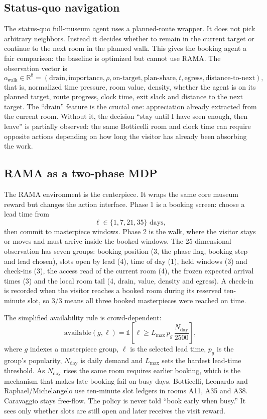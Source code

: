 \documentclass[11pt]{article}
\newcommand{\R}{\mathbb{R}}
\newcommand{\ind}{\mathbb{1}}
\begin{document}
\subsection{Status-quo navigation}

The status-quo full-museum agent uses a planned-route wrapper. It does not pick arbitrary neighbors.
Instead it decides whether to remain in the current target or continue to the next room in the planned walk.
This gives the booking agent a fair comparison: the baseline is optimized but cannot use RAMA. The
observation vector is
\[
o_{\text{walk}}\in\R^8 =
(\text{drain},\text{importance},\rho,\text{on-target},\text{plan-share},t,\text{egress},
\text{distance-to-next}),
\]
that is, normalized time pressure, room value, density, whether the agent is on its planned target,
route progress, clock time, exit slack and distance to the next target. The ``drain'' feature is the
crucial one: appreciation already extracted from the current room. Without it, the decision ``stay
until I have seen enough, then leave'' is partially observed: the same Botticelli room
and clock time can require opposite actions depending on how long the visitor has already been
absorbing the work.

\subsection{RAMA as a two-phase MDP}

The RAMA environment is the centerpiece. It wraps the same core museum reward but changes the action
interface. Phase 1 is a booking screen: choose a lead time from
\[
\ell\in\{1,7,21,35\}\text{ days},
\]
then commit to masterpiece windows. Phase 2 is the walk, where the visitor stays or moves and must
arrive inside the booked windows. The 25-dimensional observation has seven groups: booking position (3, the phase flag, booking step and
lead chosen), slots open by lead (4), time of day (1), held windows (3) and check-ins (3), the access
read of the current room (4), the frozen expected arrival times (3) and the local room tail (4, drain,
value, density and egress). A check-in is recorded when the visitor reaches a booked room during its
reserved ten-minute slot, so 3/3 means all three booked masterpieces were reached on time.

The simplified availability rule is crowd-dependent:
\[
\text{available}(g,\ell)=
\ind\left[\ell \ge L_{\max}\,p_g\,\frac{N_{\text{day}}}{2500}\right],
\]
where $g$ indexes a masterpiece group, $\ell$ is the selected lead time, $p_g$ is the group's
popularity, $N_{\text{day}}$ is daily demand and $L_{\max}$ sets the hardest lead-time threshold. As
$N_{\text{day}}$ rises the same room requires earlier booking, which is the mechanism that makes late
booking fail on busy days. Botticelli, Leonardo and Raphael/Michelangelo use ten-minute slot ledgers
in rooms A11, A35 and A38. Caravaggio stays free-flow. The policy is never told ``book early when
busy.'' It sees only whether slots are still open and later receives the visit reward.
\end{document}
